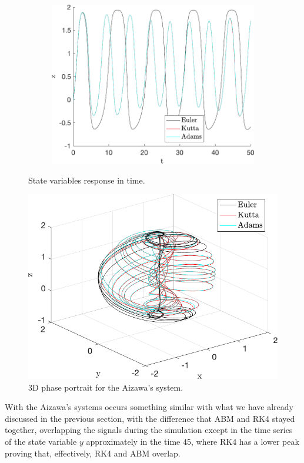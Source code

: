 \begin{figure}[H]
\begin{subfigure}[b]{0.4\textwidth}
\includegraphics[scale=0.45]{files/AizawaZvsT.pdf}
\end{subfigure}
\caption{State variables response in time.}
\label{fig:aizawaExample}
\end{figure}

\begin{figure}[H]
    \centering
    \includegraphics[scale=0.5]{files/3DIntegerAizawa.pdf}
    \caption{3D phase portrait for the Aizawa's system.}
    \label{fig:aizawa3d}
\end{figure}

With the Aizawa's systems occurs something similar with what we have already discussed in the previous section, with the difference that ABM and RK4 stayed together, overlapping the signals during the simulation except in the time series of the state variable $y$ approximately in the time 45, where RK4 has a lower peak proving that, effectively, RK4 and ABM overlap.


